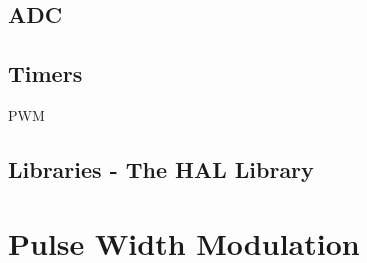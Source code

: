 \subsection{ADC}

\subsection{Timers}
PWM

\subsection{Libraries - The HAL Library}



\section{Pulse Width Modulation}







